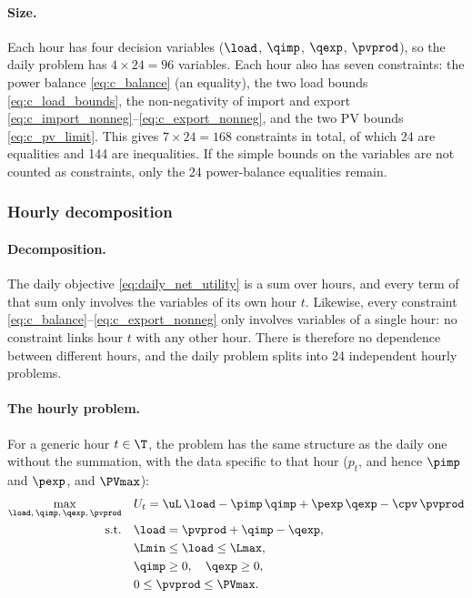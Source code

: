 \paragraph{Size.}
Each hour has four decision variables ($\load$, $\qimp$, $\qexp$, $\pvprod$), so the daily
problem has $4 \times 24 = 96$ variables. Each hour also has seven constraints: the power
balance \eqref{eq:c_balance} (an equality), the two load bounds \eqref{eq:c_load_bounds},
the non-negativity of import and export \eqref{eq:c_import_nonneg}--\eqref{eq:c_export_nonneg},
and the two PV bounds \eqref{eq:c_pv_limit}. This gives $7 \times 24 = 168$ constraints in
total, of which 24 are equalities and 144 are inequalities. If the simple bounds on the
variables are not counted as constraints, only the 24 power-balance equalities remain.

\subsubsection{Hourly decomposition}

\paragraph{Decomposition.}
The daily objective \eqref{eq:daily_net_utility} is a sum over hours, and every term of
that sum only involves the variables of its own hour $t$. Likewise, every constraint
\eqref{eq:c_balance}--\eqref{eq:c_export_nonneg} only involves variables of a single hour: no
constraint links hour $t$ with any other hour. There is therefore no dependence between
different hours, and the daily problem splits into 24 independent hourly problems.

\paragraph{The hourly problem.}
For a generic hour $t \in \T$, the problem has the same structure as the daily one without
the summation, with the data specific to that hour ($p_t$, and hence $\pimp$ and $\pexp$,
and $\PVmax$):
\begin{align}
    \max_{\load,\, \qimp,\, \qexp,\, \pvprod} \quad
    & U_t = \uL \, \load - \pimp \, \qimp + \pexp \, \qexp - \cpv \, \pvprod \\
    \text{s.t.} \quad
    & \load = \pvprod + \qimp - \qexp, \\
    & \Lmin \leq \load \leq \Lmax, \\
    & \qimp \geq 0, \quad \qexp \geq 0, \\
    & 0 \leq \pvprod \leq \PVmax.
\end{align}

